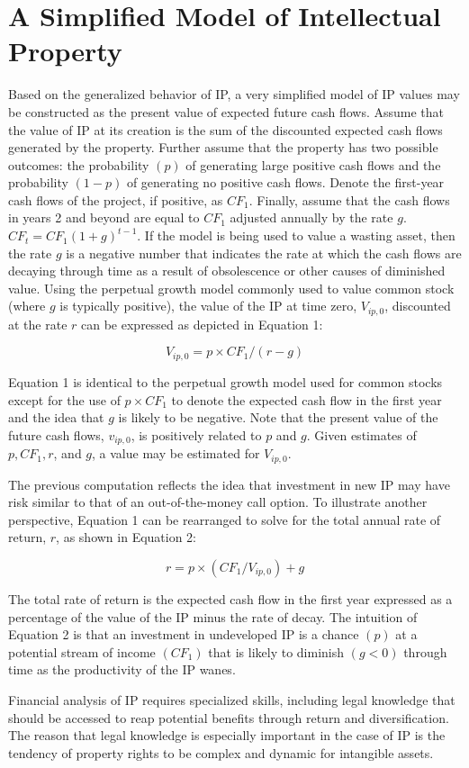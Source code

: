 \documentclass[11pt]{article}
\begin{document}
\section*{A Simplified Model of Intellectual Property}
Based on the generalized behavior of IP, a very simplified model of IP values may be constructed as the present value of expected future cash flows. Assume that the value of IP at its creation is the sum of the discounted expected cash flows generated by the property. Further assume that the property has two possible outcomes: the probability $(p)$ of generating large positive cash flows and the probability $(1-p)$ of generating no positive cash flows. Denote the first-year cash flows of the project, if positive, as $C F_{1}$. Finally, assume that the cash flows in years 2 and beyond are equal to $C F_{1}$ adjusted annually by the rate $g$. $C F_{t}=C F_{1}(1+g)^{t-1}$. If the model is being used to value a wasting asset, then the rate $g$ is a negative number that indicates the rate at which the cash flows are decaying through time as a result of obsolescence or other causes of diminished value. Using the perpetual growth model commonly used to value common stock (where $g$ is typically positive), the value of the IP at time zero, $V_{i p, 0}$, discounted at the rate $r$ can be expressed as depicted in Equation 1:


\begin{equation*}
V_{i p, 0}=p \times C F_{1} /(r-g) \tag{1}
\end{equation*}


Equation 1 is identical to the perpetual growth model used for common stocks except for the use of $p \times C F_{1}$ to denote the expected cash flow in the first year and the idea that $g$ is likely to be negative. Note that the present value of the future cash flows, $v_{i p, 0}$, is positively related to $p$ and $g$. Given estimates of $p, C F_{1}, r$, and $g$, a value may be estimated for $V_{i p, 0}$.

The previous computation reflects the idea that investment in new IP may have risk similar to that of an out-of-the-money call option. To illustrate another perspective, Equation 1 can be rearranged to solve for the total annual rate of return, $r$, as shown in Equation 2:


\begin{equation*}
r=p \times\left(C F_{1} / V_{i p, 0}\right)+g \tag{2}
\end{equation*}


The total rate of return is the expected cash flow in the first year expressed as a percentage of the value of the IP minus the rate of decay. The intuition of Equation 2 is that an investment in undeveloped IP is a chance $(p)$ at a potential stream of income $\left(C F_{1}\right)$ that is likely to diminish $(g<0)$ through time as the productivity of the IP wanes.

Financial analysis of IP requires specialized skills, including legal knowledge that should be accessed to reap potential benefits through return and diversification. The reason that legal knowledge is especially important in the case of IP is the tendency of property rights to be complex and dynamic for intangible assets.
\end{document}
